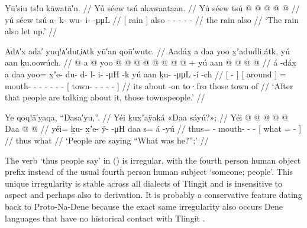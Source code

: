 \ex\label{ex:106-43-rain-let-up}%
%
\begingl
	\glpreamble	Yū′siu ts!u kāwatā′n. //
	\glpreamble	Yú séew tsú akawaataan. //
	\gla	{} Yú séew {} tsú  @ {} @ {} @ {} @ {} @ {} //
	\glb	{} yú séew {} tsú a- k- wu- i-  -μμL //
	\glc	{}[  rain {}] also - - - -  - //
	\gld	{} the rain {} also  {} {} {} {} {} //
	\glft	‘The rain also let up.’
		//
\endgl
\xe

\ex\label{ex:106-44-talk-about-it}%
%
\begingl
	\glpreamble	Adᴀ′x ada′ yuq!ᴀ′duʟ̣iᴀtk yū′an qoū′wutc. //
	\glpreamble	Aadáx̱ a daa yoo x̱ʼadudli.átk, yú aan ḵu.oowúch. //
	\gla	{}  @ {} {}
		{} a  @ {} {}
		yoo @  @ {} @ {} @ {} @ {} @ {} @ {} @ {} +
		{} yú aan  @ {} @ {} @ {} @ {} {} //
	\glb	{} á -dáx̱ {}
		{} a daa {} {}
		yoo= x̱ʼe- du- d- l- i-  -μH -k
		{} yú aan ḵu-  -μμL -í -ch {} //
	\glc	{}[  - {}]
		{}[  around \· {}]
		= mouth- - - - -  - -
		{}[  town- -  - - - {}] //
	\gld	{}  {} {}
		{} its about -on {}
		to·fro  {} {} {} {} {} {} {}
		{} those town  {} {} \·of {} {} //
	\glft	‘After that people are talking about it, those townspeople.’
		//
\endgl
\xe

\ex\label{ex:106-45-what-was-he}%
%
\begingl
	\glpreamble	Ye qoq!ā′ỵaqa, “Dasa′yu,”. //
	\glpreamble	Yéi ḵux̱ʼaÿaḵá «\!Daa sáyú?\!»; //
	\gla	Yéi @  @ {} @ {} @ {} @ {} 
		{} Daa  @ {} @ {} {} //
	\glb	yéi= ḵu- x̱ʼe- ÿ-  -μH 
		{} daa s= á -yú {} //
	\glc	thus= - mouth- -  -
		{}[ what =  - {}] //
	\gld	thus  {} {} {} {}
		{} what {}  {} {} //
	\glft	‘People are saying “What was he?”;’
		//
\endgl
\xe

The verb  ‘thus people say’ in (\lastx) is irregular, with the fourth person human object prefix  instead of the usual fourth person human subject  ‘someone; people’.
This unique irregularity is stable across all dialects of Tlingit and is insensitive to aspect and perhaps also to derivation.
It is probably a conservative feature dating back to Proto-Na-Dene because the exact same irregularity also occurs Dene languages that have no historical contact with Tlingit \parencite[77]{leer:1990a}.

